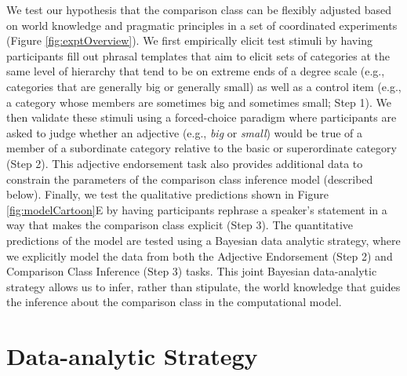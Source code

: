 \documentclass[doc]{apa6}
\begin{document}
We test our hypothesis that the comparison class can be flexibly adjusted based on world knowledge and pragmatic principles in a set of coordinated experiments (Figure \ref{fig:exptOverview}).
We first empirically elicit test stimuli by having participants fill out phrasal templates that aim to elicit sets of categories at the same level of hierarchy that tend to be on extreme ends of a degree scale (e.g., categories that are generally big or generally small) as well as a control item (e.g., a category whose members are sometimes big and sometimes small; Step 1). 
We then validate these stimuli using a forced-choice paradigm where participants are asked to judge whether an adjective (e.g., \emph{big} or \emph{small}) would be true of a member of a subordinate category relative to the basic or superordinate category (Step 2). 
This adjective endorsement task also provides additional data to constrain the parameters of the comparison class inference model (described below).
Finally, we test the qualitative predictions shown in Figure \ref{fig:modelCartoon}E by having participants rephrase a speaker's statement in a way that makes the comparison class explicit (Step 3).
The quantitative predictions of the model are tested using a Bayesian data analytic strategy, where we explicitly model the data from both the Adjective Endorsement (Step 2) and Comparison Class Inference (Step 3) tasks.
This joint Bayesian data-analytic strategy allows us to infer, rather than stipulate, the world knowledge that guides the inference about the comparison class in the computational model. 

\section{Data-analytic Strategy}
\end{document}
